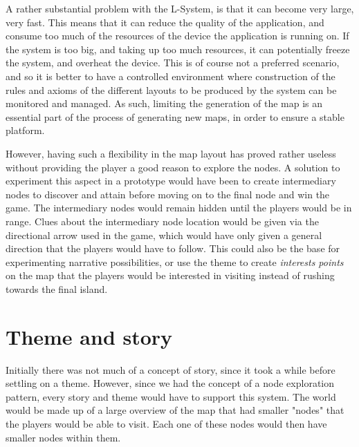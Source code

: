 A rather substantial problem with the L-System, is that it can become very large, very fast. This means that it can reduce the quality of the application, and consume too much of the resources of the device the application is running on. If the system is too big, and taking up too much resources, it can potentially freeze the system, and overheat the device. This is of course not a preferred scenario, and so it is better to have a controlled environment where construction of the rules and axioms of the different layouts to be produced by the system can be monitored and managed. As such, limiting the generation of the map is an essential part of the process of generating new maps, in order to ensure a stable platform.

However, having such a flexibility in the map layout has proved rather useless without providing the player a good reason to explore the nodes. A solution to experiment this aspect in a prototype would have been to create intermediary nodes to discover and attain before moving on to the final node and win the game. The intermediary nodes would remain hidden until the players would be in range. Clues about the intermediary node location would be given via the directional arrow used in the game, which would have only given a general direction that the players would have to follow. This could also be the base for experimenting narrative possibilities, or use the theme to create \textit{interests points} on the map that the players would be interested in visiting instead of rushing towards the final island.

\section{Theme and story}
Initially there was not much of a concept of story, since it took a while before settling on a theme. However, since we had the concept of a node exploration pattern, every story and theme would have to support this system. The world would be made up of a large overview of the map that had smaller "nodes" that the players would be able to visit. Each one of these nodes would then have smaller nodes within them.

